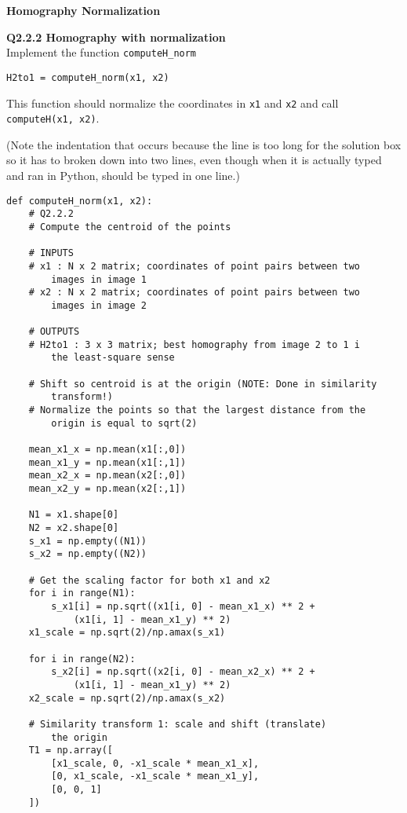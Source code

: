 \documentclass[12pt,letterpaper, onecolumn]{exam}
\begin{document}
\begin{questions}
    \pagebreak

    \begingroup
    \large \textbf{Homography Normalization}
    \endgroup

    \question \textbf{Q2.2.2 Homography with normalization} \\
    Implement the function \texttt{computeH\_norm}

    \begin{center}
        \texttt{H2to1 = computeH\_norm(x1, x2)}
    \end{center}

    This function should normalize the coordinates in \texttt{x1} and \texttt{x2} and call \texttt{computeH(x1, x2)}.

    \begin{solution}
    (Note the indentation that occurs because the line is too long for the solution box so it has to broken down into two lines, even though when it is actually typed and ran in Python, should be typed in one line.)
        \begin{verbatim}
def computeH_norm(x1, x2):
    # Q2.2.2
    # Compute the centroid of the points
 
    # INPUTS
    # x1 : N x 2 matrix; coordinates of point pairs between two
        images in image 1
    # x2 : N x 2 matrix; coordinates of point pairs between two
        images in image 2
	
    # OUTPUTS
    # H2to1 : 3 x 3 matrix; best homography from image 2 to 1 i
        the least-square sense
    
    # Shift so centroid is at the origin (NOTE: Done in similarity
        transform!)
    # Normalize the points so that the largest distance from the
        origin is equal to sqrt(2)
    
    mean_x1_x = np.mean(x1[:,0])
    mean_x1_y = np.mean(x1[:,1])
    mean_x2_x = np.mean(x2[:,0])
    mean_x2_y = np.mean(x2[:,1])
 
    N1 = x1.shape[0]
    N2 = x2.shape[0]
    s_x1 = np.empty((N1))
    s_x2 = np.empty((N2))

    # Get the scaling factor for both x1 and x2
    for i in range(N1):
        s_x1[i] = np.sqrt((x1[i, 0] - mean_x1_x) ** 2 +
            (x1[i, 1] - mean_x1_y) ** 2)
    x1_scale = np.sqrt(2)/np.amax(s_x1)
    
    for i in range(N2):
        s_x2[i] = np.sqrt((x2[i, 0] - mean_x2_x) ** 2 +
            (x1[i, 1] - mean_x1_y) ** 2)
    x2_scale = np.sqrt(2)/np.amax(s_x2)
    
    # Similarity transform 1: scale and shift (translate)
        the origin
    T1 = np.array([
        [x1_scale, 0, -x1_scale * mean_x1_x],
        [0, x1_scale, -x1_scale * mean_x1_y],
        [0, 0, 1]
    ])
 

\end{verbatim}
\end{solution}
\end{questions}
\end{document}
